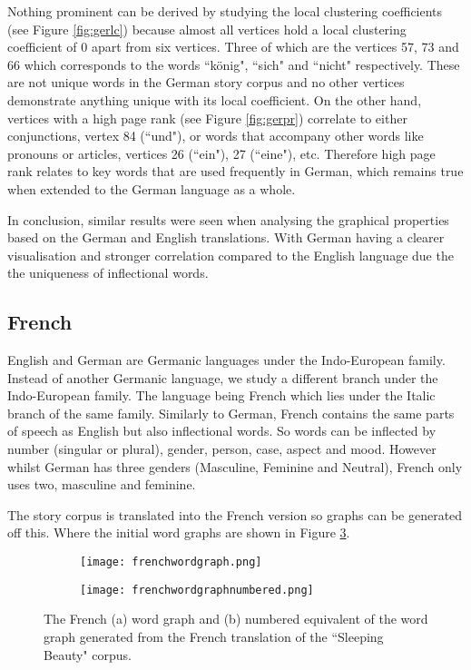 Nothing prominent can be derived by studying the local clustering coefficients (see Figure \ref{fig:gerlc}) because almost all vertices hold a local clustering coefficient of 0 apart from six vertices. Three of which are the vertices 57, 73 and 66 which corresponds to the words ``könig", ``sich" and ``nicht" respectively. These are not unique words in the German story corpus and no other vertices demonstrate anything unique with its local coefficient. 
On the other hand, vertices with a high page rank (see Figure \ref{fig:gerpr}) correlate to either conjunctions, vertex 84 (``und"), or words that accompany other words like pronouns or articles, vertices 26 (``ein"), 27 (``eine"), etc. Therefore high page rank relates to key words that are used frequently in German, which remains true when extended to the German language as a whole.

In conclusion, similar results were seen when analysing the graphical properties based on the German and English translations. With German having a clearer visualisation and stronger correlation compared to the English language due the the uniqueness of inflectional words.

\subsection{French}
English and German are Germanic languages under the Indo-European family. Instead of another Germanic language, we study a different branch under the Indo-European family. The language being French which lies under the Italic branch of the same family. Similarly to German, French contains the same parts of speech as English but also inflectional words. So words can be inflected by number (singular or plural), gender, person, case, aspect and mood. However whilst German has three genders (Masculine, Feminine and Neutral), French \cite{hawkins2015french} only uses two, masculine and feminine. 

The story corpus is translated into the French version so graphs can be generated off this. Where the initial word graphs are shown in Figure \ref{fig:fregraph}. 

\begin{figure}[H]
\centering
\begin{subfigure}{.45\textwidth}
	\texttt{[image: frenchwordgraph.png]}
	\caption{}
	\label{fig:freword}
\end{subfigure}
\hfill
\begin{subfigure}{.45\textwidth}
	\texttt{[image: frenchwordgraphnumbered.png]}
	\caption{}
	\label{fig:frenum}
\end{subfigure}
\caption{The French (a) word graph and (b) numbered equivalent of the word graph generated from the French translation of the ``Sleeping Beauty" corpus.}
\label{fig:fregraph}
\end{figure}

